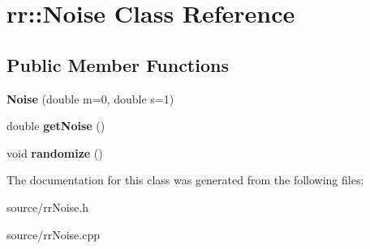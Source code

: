 \hypertarget{classrr_1_1_noise}{\section{rr\-:\-:Noise Class Reference}
\label{classrr_1_1_noise}
}
\subsection*{Public Member Functions}
\begin{DoxyCompactItemize}
\item 
\hypertarget{classrr_1_1_noise_a72d1c9b42aad7aaf756ff9a593be43eb}{{\bfseries Noise} (double m=0, double s=1)}\label{classrr_1_1_noise_a72d1c9b42aad7aaf756ff9a593be43eb}

\item 
\hypertarget{classrr_1_1_noise_a87df50c6293152a8809408ec995e4911}{double {\bfseries get\-Noise} ()}\label{classrr_1_1_noise_a87df50c6293152a8809408ec995e4911}

\item 
\hypertarget{classrr_1_1_noise_ab1c7661a74d03fcb8dd75773fb868bf5}{void {\bfseries randomize} ()}\label{classrr_1_1_noise_ab1c7661a74d03fcb8dd75773fb868bf5}

\end{DoxyCompactItemize}


The documentation for this class was generated from the following files\-:\begin{DoxyCompactItemize}
\item 
source/rr\-Noise.\-h\item 
source/rr\-Noise.\-cpp\end{DoxyCompactItemize}
